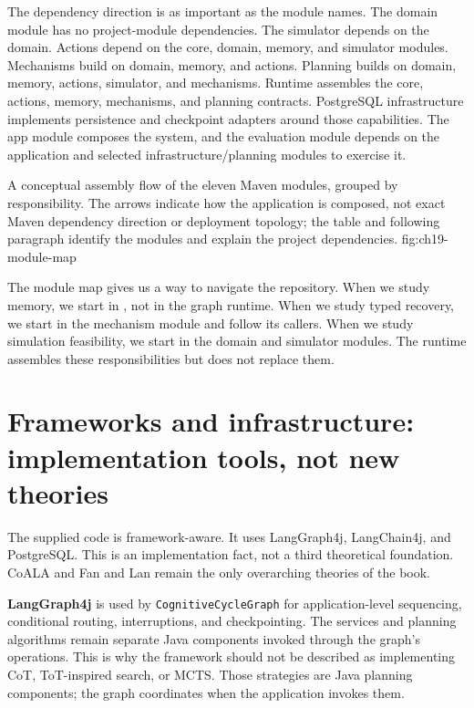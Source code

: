 The dependency direction is as important as the module names. The domain module has no project-module dependencies. The simulator depends on the domain. Actions depend on the core, domain, memory, and simulator modules. Mechanisms build on domain, memory, and actions. Planning builds on domain, memory, actions, simulator, and mechanisms. Runtime assembles the core, actions, memory, mechanisms, and planning contracts. PostgreSQL infrastructure implements persistence and checkpoint adapters around those capabilities. The app module composes the system, and the evaluation module depends on the application and selected infrastructure/planning modules to exercise it.

  {A conceptual assembly flow of the eleven Maven modules, grouped by responsibility. The arrows indicate how the application is composed, not exact Maven dependency direction or deployment topology; the table and following paragraph identify the modules and explain the project dependencies.}
  {fig:ch19-module-map}

The module map gives us a way to navigate the repository. When we study memory, we start in , not in the graph runtime. When we study typed recovery, we start in the mechanism module and follow its callers. When we study simulation feasibility, we start in the domain and simulator modules. The runtime assembles these responsibilities but does not replace them.

\section{Frameworks and infrastructure: implementation tools, not new theories}
\label{sec:ch19-framework-boundaries}

The supplied code is framework-aware. It uses LangGraph4j, LangChain4j, and PostgreSQL. This is an implementation fact, not a third theoretical foundation. CoALA and Fan and Lan remain the only overarching theories of the book.

\textbf{LangGraph4j} is used by \texttt{CognitiveCycle\allowbreak{}Graph} for application-level sequencing, conditional routing, interruptions, and checkpointing. The services and planning algorithms remain separate Java components invoked through the graph's operations. This is why the framework should not be described as implementing CoT, ToT-inspired search, or MCTS. Those strategies are Java planning components; the graph coordinates when the application invokes them.

